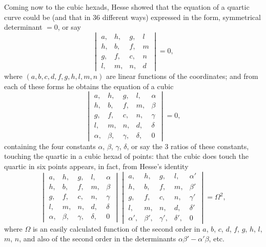 \documentclass[11pt,a4paper]{book}
\begin{document}
\clearpage
Coming now to the cubic hexads, Hesse showed that the equation of a quartic curve could be (and that in 36 different ways) expressed in the form, symmetrical determinant $= 0$, or say
\[
\begin{vmatrix}
a, & h, & g, & l \\
h, & b, & f, & m \\
g, & f, & c, & n \\
l, & m, & n, & d
\end{vmatrix}
= 0,
\]
where $(a, b, c, d, f, g, h, l, m, n)$ are linear functions of the coordinates; and from each of these forms he obtains the equation of a cubic
\[
\begin{vmatrix}
a, & h, & g, & l, & \alpha \\
h, & b, & f, & m, & \beta \\
g, & f, & c, & n, & \gamma \\
l, & m, & n, & d, & \delta \\
\alpha, & \beta, & \gamma, & \delta, & 0
\end{vmatrix}
= 0,
\]
containing the four constants $\alpha$, $\beta$, $\gamma$, $\delta$, or say the 3 ratios of these constants, touching the quartic in a cubic hexad of points: that the cubic does touch the quartic in six points appears, in fact, from Hesse's identity
\[
\begin{vmatrix}
a, & h, & g, & l, & \alpha \\
h, & b, & f, & m, & \beta \\
g, & f, & c, & n, & \gamma \\
l, & m, & n, & d, & \delta \\
\alpha, & \beta, & \gamma, & \delta, & 0
\end{vmatrix}
\begin{vmatrix}
a, & h, & g, & l, & \alpha' \\
h, & b, & f, & m, & \beta' \\
g, & f, & c, & n, & \gamma' \\
l, & m, & n, & d, & \delta' \\
\alpha', & \beta', & \gamma', & \delta', & 0
\end{vmatrix}
= \Omega^2,
\]
where $\Omega$ is an easily calculated function of the second order in $a$, $b$, $c$, $d$, $f$, $g$, $h$, $l$, $m$, $n$, and also of the second order in the determinants $\alpha\beta' - \alpha'\beta$, etc.
\end{document}
